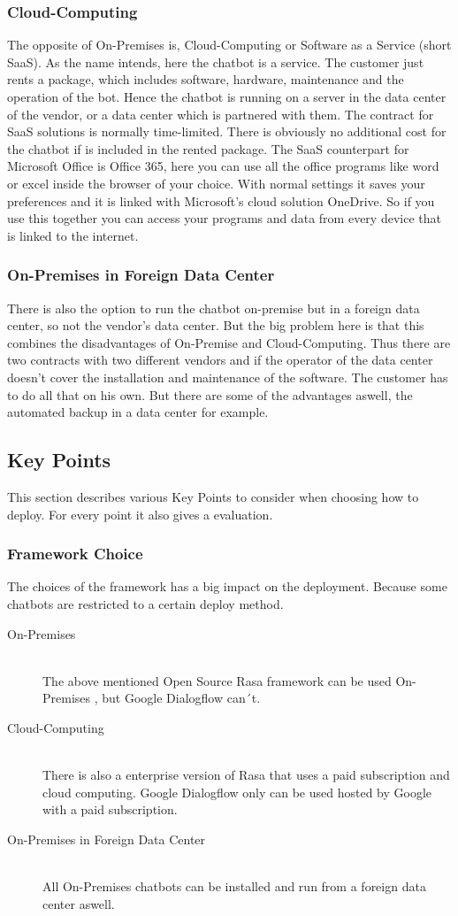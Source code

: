 \documentclass[10pt,final,journal,a4paper,oneside,twocolumn]{IEEEtran}
\begin{document}
\subsubsection{Cloud-Computing}
The opposite of On-Premises is, Cloud-Computing or Software as a Service (short SaaS). As the name intends, here the chatbot is a service. The customer just rents a package, which includes software, hardware, maintenance and the operation of the bot. Hence the chatbot is running on a server in the data center of the vendor, or a data center which is partnered with them. The contract for SaaS solutions is normally time-limited. \cite{b26} There is obviously no additional cost for the chatbot if is included in the rented package. The SaaS counterpart for Microsoft Office is Office 365, here you can use all the office programs like word or excel inside the browser of your choice. With normal settings it saves your preferences and it is linked with Microsoft's cloud solution OneDrive. So if you use this together you can access your programs and data from every device that is linked to the internet.  
\subsubsection{On-Premises in Foreign Data Center}
There is also the option to run the chatbot on-premise but in a foreign data center, so not the vendor's data center. But the big problem here is that this combines the disadvantages of On-Premise and Cloud-Computing. Thus there are two contracts with two different vendors and if the operator of the data center doesn't cover the installation and maintenance of the software. The customer has to do all that on his own. But there are some of the advantages aswell, the automated backup in a data center for example.
\subsection{Key Points}
This section describes various Key Points to consider when choosing how to deploy. For every point it also gives a evaluation.
\subsubsection{Framework Choice}
The choices of the framework has a big impact on the deployment. Because some chatbots are restricted to a certain deploy method.
\begin{description}
\item[On-Premises]\hfill \\
The above mentioned Open Source Rasa framework can be used On-Premises \cite{b22}, but Google Dialogflow can´t.
\item[Cloud-Computing]\hfill \\ 
There is also a enterprise version of Rasa that uses a paid subscription and cloud computing. \cite{b22} Google Dialogflow only can be used hosted by Google with a paid subscription. \cite{b28}
\item[On-Premises in Foreign Data Center]\hfill \\
All On-Premises chatbots can be installed and run from a foreign data center aswell.
\end{description}
\end{document}

